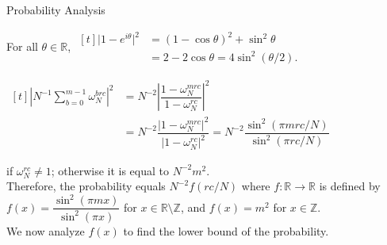 \documentclass{beamer}
\newcommand{\mbb}[1]{\mathbb{#1}}
\renewcommand{\:}{\text{ }}
\begin{document}
    \begin{frame}{Probability Analysis}
        \begin{exampleblock}{}
            \small \centering
            For all $\theta \in \mbb{R}$,
            $\begin{aligned}[t]
                \big| 1 - e^{i\theta} \big|^2 &= (1 - \cos \theta)^2 + \sin^2 \theta \\
                &= 2 - 2 \cos \theta = 4 \sin^2 (\theta/2)\text{.}
            \end{aligned}$
        \end{exampleblock}
        \begin{block}{}
            \small
            \centerline{$\begin{aligned}[t]
                \textstyle \left| N^{-1} \sum_{b=0}^{m-1} \omega_N^{brc} \right|^2
                &= \textstyle N^{-2} \left| \dfrac{1 - \omega_N^{mrc}}{1 - \omega_N^{rc}} \right|^2 \\
                &= \textstyle N^{-2} \dfrac{\big| 1 - \omega_N^{mrc} \big|^2}{\big| 1 - \omega_N^{rc} \big|^2}
                 =            N^{-2} \dfrac{\sin^2 (\pi mrc/N)}{\sin^2 (\pi rc/N)}
            \end{aligned}$} \vspace*{.5em}
            if $\omega_N^{rc} \neq 1$; otherwise it is equal to $N^{-2}m^2$. \\[.5em]
            Therefore, the probability equals $N^{-2}f(rc/N)$ where
            $f \colon \mbb{R} \to \mbb{R}$ is defined by $f(x) = \dfrac{\sin^2(\pi mx)}{\sin^2(\pi x)}$ for $x \in \mbb{R} \setminus \mbb{Z}$,
            and $f(x) = m^2$ for $x \in \mbb{Z}$. \\[.5em]
            We now analyze $f(x)$ to find the lower bound of the probability.
        \end{block}
    \end{frame}
\end{document}
